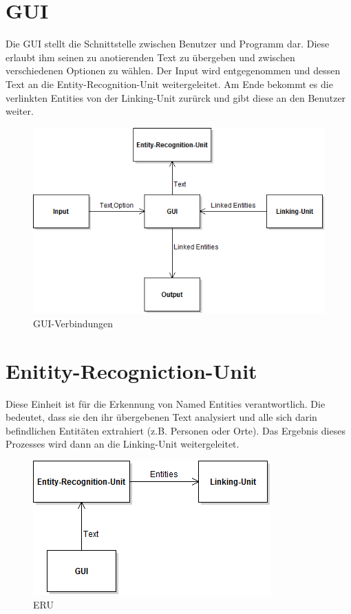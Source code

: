 \documentclass[11pt, a4paper, oneside]{Thesis} %
\begin{document}
\section{GUI}
Die GUI stellt die Schnittstelle zwischen Benutzer und Programm dar. Diese erlaubt ihm seinen zu anotierenden Text zu \"ubergeben und zwischen verschiedenen Optionen zu w\"ahlen. Der Input wird entgegenommen und dessen Text an die Entity-Recognition-Unit weitergeleitet. Am Ende bekommt es die verlinkten Entities von der Linking-Unit zur\"urck und gibt diese an den Benutzer weiter.
\begin{figure}[!ht]
\centering
\includegraphics[scale=0.55]{./GUI.png}
\caption[GUI]{GUI-Verbindungen}
\end{figure}


\section{Enitity-Recogniction-Unit}
Diese Einheit ist f\"ur die Erkennung von Named Entities verantwortlich. Die bedeutet, dass sie den ihr \"ubergebenen Text analysiert und alle sich darin befindlichen Entit\"aten extrahiert (z.B. Personen oder Orte). Das Ergebnis dieses Prozesses wird dann an die Linking-Unit weitergeleitet.
\begin{figure}[ht!]
\centering
\includegraphics[scale=0.55]{./eeu.png}
\caption[Entity-Extraction-Unit]{ERU}
\end{figure}
\end{document}

